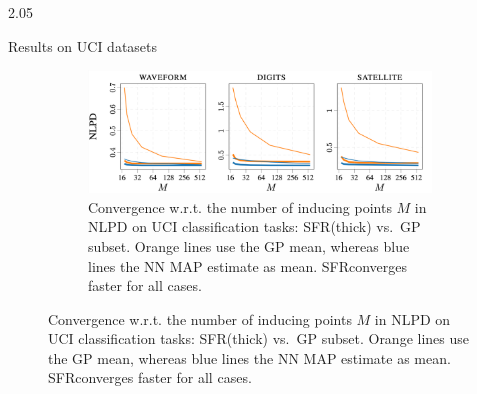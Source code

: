 \documentclass[final,12pt]{beamer}
\newcommand{\our}{SFR}
\newlength{\colwidth}
\begin{document}
\begin{frame}[t]
\begin{columns}
\begin{column}{2.05\colwidth}
\begin{block}{Results on UCI datasets}
\begin{figure}
\begin{subfigure}[b]{0.3\textwidth}\centering
	\includegraphics[scale=0.2]{fig/nlpd.pdf}
  \caption{\footnotesize Convergence w.r.t. the number of inducing points $M$ in NLPD on UCI classification tasks: \our (thick) vs.\ GP subset. Orange lines 
  use the GP mean, whereas blue lines 
the NN MAP estimate as mean. \our converges faster for all cases.}
\end{subfigure}
\end{figure}


\end{block}
\end{column}
\end{columns}
\end{frame}
\end{document}
